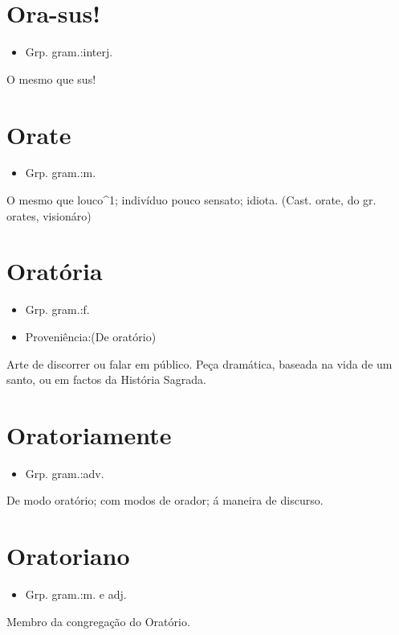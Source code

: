 \section{Ora-sus!}
\begin{itemize}
\item {Grp. gram.:interj.}
\end{itemize}
O mesmo que \textunderscore sus!\textunderscore 
\section{Orate}
\begin{itemize}
\item {Grp. gram.:m.}
\end{itemize}
O mesmo que \textunderscore louco\textunderscore ^1; indivíduo pouco sensato; idiota.
(Cast. \textunderscore orate\textunderscore , do gr. \textunderscore orates\textunderscore , visionáro)
\section{Oratória}
\begin{itemize}
\item {Grp. gram.:f.}
\end{itemize}
\begin{itemize}
\item {Proveniência:(De \textunderscore oratório\textunderscore )}
\end{itemize}
Arte de discorrer ou falar em público.
Peça dramática, baseada na vida de um santo, ou em factos da História Sagrada.
\section{Oratoriamente}
\begin{itemize}
\item {Grp. gram.:adv.}
\end{itemize}
De modo oratório; com modos de orador; á maneira de discurso.
\section{Oratoriano}
\begin{itemize}
\item {Grp. gram.:m.  e  adj.}
\end{itemize}
Membro da congregação do Oratório.
